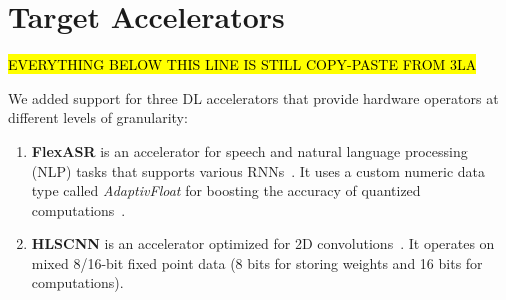 \section{Target Accelerators}
\label{sec.eval-acc}

\hl{EVERYTHING BELOW THIS LINE IS STILL COPY-PASTE FROM 3LA}

We added support for three DL accelerators that provide hardware operators at different levels of granularity:
\begin{enumerate}[leftmargin=*]

\item \textbf{FlexASR} is an accelerator for speech and natural language processing (NLP) tasks that supports various RNNs~\cite{tambe20219}.
%
It uses a custom numeric data type called \textit{AdaptivFloat} for boosting the accuracy of quantized computations~\cite{tambe2020algorithm}.
%
%
%


\item \textbf{HLSCNN} is an accelerator optimized for 2D convolutions~\cite{whatmough201916nm}.
%
%
It operates on mixed 8/16-bit fixed point data
(8 bits for storing weights and 16 bits for computations).
%


\end{enumerate}

